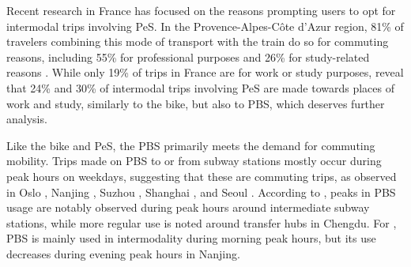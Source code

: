 \begin{refsegment}
Recent research in France has focused on the reasons prompting users to opt for intermodal trips involving \acrshort{PeS}. In the Provence-Alpes-Côte d'Azur region, 81\% of travelers combining this mode of transport with the train do so for commuting reasons, including 55\% for professional purposes and 26\% for study-related reasons \textcolor{blue}{\autocite[184]{moinse_intermodal_2022}}. While only 19\% of trips in France are for work or study purposes, \textcolor{blue}{\textcite[62]{rabaud_quand_2022}} reveal that 24\% and 30\% of intermodal trips involving \acrshort{PeS} are made towards places of work and study, similarly to the bike, but also to \acrshort{PBS}, which deserves further analysis.%

Like the bike and \acrshort{PeS}, the \acrshort{PBS} primarily meets the demand for commuting mobility. Trips made on \acrshort{PBS} to or from subway stations mostly occur during peak hours on weekdays, suggesting that these are commuting trips, as observed in Oslo \textcolor{blue}{\autocite[394]{bocker_bike_2020}}, Nanjing \textcolor{blue}{\autocite[68]{ma_understanding_2018}}, Suzhou \textcolor{blue}{\autocite[10]{gu_measuring_2019}}, Shanghai \textcolor{blue}{\autocite[8]{yu_policy_2021}}, and Seoul \textcolor{blue}{\autocite[8]{kim_analysis_2021}}. According to \textcolor{blue}{\textcite[890]{bi_analysis_2021}}, peaks in \acrshort{PBS} usage are notably observed during peak hours around intermediate subway stations, while more regular use is noted around transfer hubs in Chengdu. For \textcolor{blue}{\textcite[128]{liu_understanding_2020}}, \acrshort{PBS} is mainly used in intermodality during morning peak hours, but its use decreases during evening peak hours in Nanjing.%


\end{refsegment}
